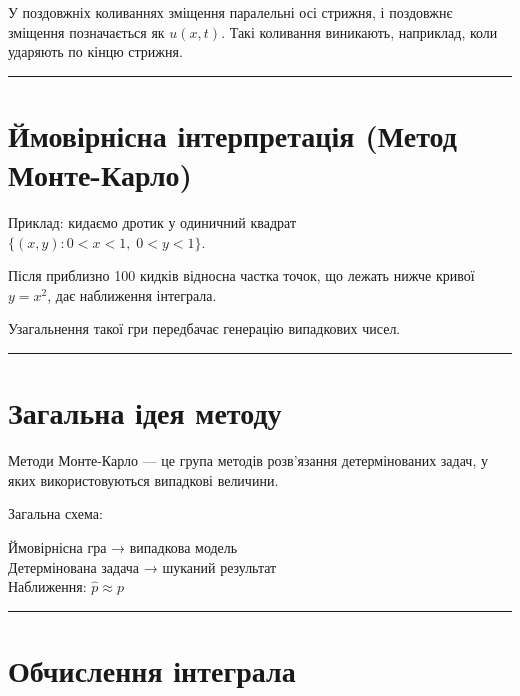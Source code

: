 \documentclass[
  ukrainian,
]{article}
\begin{document}
У поздовжніх коливаннях зміщення паралельні осі стрижня, і поздовжнє
зміщення позначається як \(u(x,t)\). Такі коливання виникають,
наприклад, коли ударяють по кінцю стрижня.

\begin{center}\rule{0.5\linewidth}{0.5pt}\end{center}

\section{Ймовірнісна інтерпретація (Метод
Монте-Карло)}\label{ux439ux43cux43eux432ux456ux440ux43dux456ux441ux43dux430-ux456ux43dux442ux435ux440ux43fux440ux435ux442ux430ux446ux456ux44f-ux43cux435ux442ux43eux434-ux43cux43eux43dux442ux435-ux43aux430ux440ux43bux43e}

Приклад: кидаємо дротик у одиничний квадрат\\
\(\{(x, y): 0 < x < 1,\; 0 < y < 1\}\).

Після приблизно 100 кидків відносна частка точок, що лежать нижче кривої
\(y = x^2\), дає наближення інтеграла.

Узагальнення такої гри передбачає генерацію випадкових чисел.

\begin{center}\rule{0.5\linewidth}{0.5pt}\end{center}

\section{Загальна ідея
методу}\label{ux437ux430ux433ux430ux43bux44cux43dux430-ux456ux434ux435ux44f-ux43cux435ux442ux43eux434ux443}

Методи Монте-Карло --- це група методів розв'язання детермінованих
задач, у яких використовуються випадкові величини.

Загальна схема:

Ймовірнісна гра → випадкова модель\\
Детермінована задача → шуканий результат\\
Наближення: \(\hat{p} \approx p\)

\begin{center}\rule{0.5\linewidth}{0.5pt}\end{center}

\section{Обчислення
інтеграла}\label{ux43eux431ux447ux438ux441ux43bux435ux43dux43dux44f-ux456ux43dux442ux435ux433ux440ux430ux43bux430}
\end{document}
